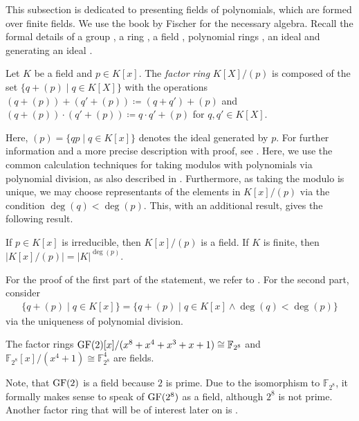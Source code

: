 This subsection is dedicated to presenting fields of polynomials, which are formed over finite fields. We use the book by Fischer \cite{Fischer2017} for the necessary algebra. Recall the formal details of a group \cite[p. 5]{Fischer2017}, a ring \cite[pp. 171-172]{Fischer2017}, a field \cite[p. 174]{Fischer2017},  polynomial rings \cite[pp. 183-186]{Fischer2017}, an ideal and generating an ideal \cite[p. 206]{Fischer2017}.

\begin{definition}
    Let \(K\) be a field and \(p \in K[x]\). The \emph{factor ring} \(K[X]/(p)\) is composed of the set \(\{q + (p) \mid q \in K[X]\}\) with the operations \((q + (p)) + (q' + (p)) \coloneqq (q + q') + (p)\) and \((q + (p)) \cdot (q' + (p)) \coloneqq q \cdot q' + (p)\) for \(q, q' \in K[X]\).
\end{definition}

Here, \((p) = \{q p \mid q \in K[x]\}\) denotes the ideal generated by \(p\). For further information and a more precise description with proof, see \cite[p. 208]{Fischer2017}. Here, we use the common calculation techniques for taking modulos with polynomials via polynomial division, as also described in \cite[p. 188]{Fischer2017}. Furthermore, as taking the modulo is unique, we may choose representants of the elements in \(K[x]/(p)\) via the condition \(\deg(q) < \deg(p)\). This, with an additional result, gives the following result.

\begin{theorem}
    If \(p \in K[x]\) is irreducible, then \(K[x]/(p)\) is a field. If \(K\) is finite, then \(|K[x]/(p)| = |K|^{\deg(p)}\).
\end{theorem}

For the proof of the first part of the statement, we refer to \cite[p. 313]{Fischer2017}. For the second part, consider
\begin{align}
    \{q + (p) \mid q \in K[x]\} = \{q + (p) \mid q \in K[x] \land \deg(q) < \deg(p)\}
\end{align}
via the uniqueness of polynomial division.

\begin{corollary} \label{byte_field}
    The factor rings \(\operatorname{GF}(2)[x]/(x^8+x^4+x^3+x+1) \cong \mathbb{F}_{2^8}\) and \(\mathbb{F}_{2^8}[x]/(x^4+1) \cong \mathbb{F}_{2^8}^4\) are fields.
\end{corollary}

Note, that \(\operatorname{GF}(2)\) is a field because \(2\) is prime. Due to the isomorphism to \(\mathbb{F}_{2^8}\), it formally makes sense to speak of \(\operatorname{GF}(2^8)\) as a field, although \(2^8\) is not prime. Another factor ring that will be of interest later on is .

